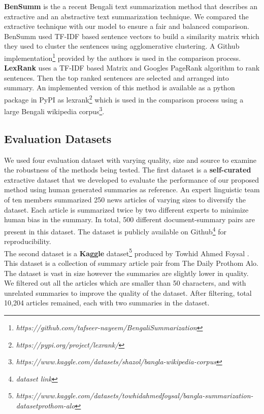 \textbf{BenSumm} \cite{chowdhury-etal-2021-tfidf-clustering} is the a recent Bengali text summarization method that describes an extractive and an abstractive text summarization technique. We compared the extractive technique with our model to ensure a fair and balanced comparison. BenSumm used TF-IDF based sentence vectors to build a similarity matrix which they used to cluster the sentences using agglomerative clustering. A Github implementation\footnote{\textit{https://github.com/tafseer-nayeem/BengaliSummarization}} provided by the authors is used in the comparison process.\\

\textbf{LexRank} \cite{Erkan-lexRank-2004} uses a TF-IDF based Matrix and Googles PageRank algorithm \cite{page-PageRank-1999} to rank sentences. Then the top ranked sentences are selected and arranged into summary. An implemented version of this method is available as a python package in PyPI as lexrank\footnote{\textit{https://pypi.org/project/lexrank/}} which is used in the comparison process using a large Bengali wikipedia corpus\footnote{\textit{https://www.kaggle.com/datasets/shazol/bangla-wikipedia-corpus}}.

\subsection{Evaluation Datasets}\label{subsec:evaluation-datasets}
We used four evaluation dataset with varying quality, size and source to examine the robustness of the methods being tested. The first dataset is a \textbf{self-curated} extractive dataset that we developed to evaluate the performance of our proposed method using human generated summaries as reference. An expert linguistic team of ten members summarized 250 news articles of varying sizes to diversify the dataset. Each article is summarized twice by two different experts to minimize human bias in the summary. In total, 500 different document-summary pairs are present in this dataset. The dataset is publicly available on Github\footnote{\textit{dataset link}} for reproducibility.\\

The second dataset is a \textbf{Kaggle} dataset\footnote{\textit{https://www.kaggle.com/datasets/towhidahmedfoysal/bangla-summarization-datasetprothom-alo}} produced by Towhid Ahmed Foysal \cite{ahmed_2023_TAF_dataset}. This dataset is a collection of summary article pair from The Daily Prothom Alo. The dataset is vast in size however the summaries are slightly lower in quality. We filtered out all the articles which are smaller than 50 characters, and with unrelated summaries to improve the quality of the dataset. After filtering, total 10,204 articles remained, each with two summaries in the dataset.\\

